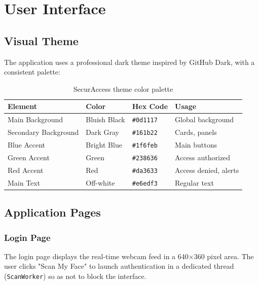 \chapter{User Interface}

\section{Visual Theme}

The application uses a professional dark theme inspired by GitHub Dark, with a consistent palette:

\begin{table}[H]
    \centering
    \begin{tabular}{llll}
        \toprule
        \textbf{Element} & \textbf{Color} & \textbf{Hex Code} & \textbf{Usage} \\
        \midrule
        Main Background      & Bluish Black  & \texttt{\#0d1117} & Global background \\
        Secondary Background & Dark Gray     & \texttt{\#161b22} & Cards, panels \\
        Blue Accent          & Bright Blue   & \texttt{\#1f6feb} & Main buttons \\
        Green Accent         & Green         & \texttt{\#238636} & Access authorized \\
        Red Accent           & Red           & \texttt{\#da3633} & Access denied, alerts \\
        Main Text            & Off-white     & \texttt{\#e6edf3} & Regular text \\
        \bottomrule
    \end{tabular}
    \caption{SecurAccess theme color palette}
\end{table}

\section{Application Pages}

\subsection{Login Page}

The login page displays the real-time webcam feed in a 640$\times$360 pixel area. The user clicks "Scan My Face" to launch authentication in a dedicated thread (\texttt{ScanWorker}) so as not to block the interface.

